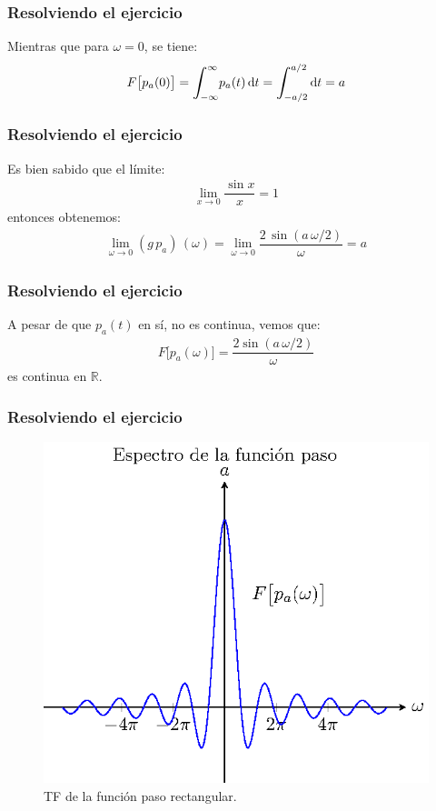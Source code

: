 \begin{frame}
\frametitle{Resolviendo el ejercicio}
Mientras que para $\omega = 0$, se tiene:
\pause
\begin{align*}
F \big[p_{a}(0)\big] = \scaleint{6ex}_{\bs -\infty}^{\infty} p_{a}(t) \dd{t} = \scaleint{6ex}_{\bs -a/2}^{a/2} \dd{t} = a
\end{align*}
\end{frame}
\begin{frame}
\frametitle{Resolviendo el ejercicio}
Es bien sabido que el límite:
\pause
\begin{align*}
\lim_{x \to 0} \dfrac{\sin x}{x} = 1
\end{align*}
\pause
entonces obtenemos:
\pause
\begin{align*}
\lim_{\omega \to 0}  (g \, p_{a}) \, (\omega) = \lim_{\omega \to 0} \dfrac{2 \, \sin (a \, \omega /2)}{\omega} = a
\end{align*}
\end{frame}
\begin{frame}
\frametitle{Resolviendo el ejercicio}
A pesar de que $p_{a}(t)$ en sí, no es continua, vemos que:
\pause
\begin{align}
F \big[p_{a}(\omega)\big] = \dfrac{2 \sin (a \, \omega/2)}{\omega}
\label{eq:ecuacion_06_11_Beerends}
\end{align}
es continua en $\mathbb{R}$.
\end{frame}
\begin{frame}
\frametitle{Resolviendo el ejercicio}
\begin{figure}[H]
    \centering
    \includegraphics[scale=0.8]{Imagenes/T_Funcionpaso.eps}
    \caption{TF de la función paso rectangular.}
    \label{fig:figura_Tfuncionpaso}
\end{figure}
\end{frame}
